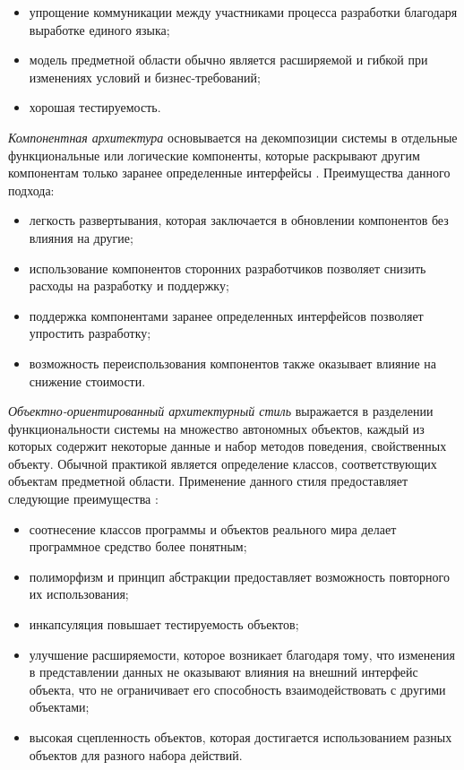 \begin{itemize}
	\item упрощение коммуникации между участниками процесса разработки благодаря выработке единого языка;
	\item модель предметной области обычно является расширяемой и гибкой при изменениях условий и бизнес-требований;
	\item хорошая тестируемость.
\end{itemize}

\emph{Компонентная архитектура} основывается на декомпозиции системы в отдельные функциональные или логические компоненты, которые раскрывают другим компонентам только заранее определенные интерфейсы \cite{application_architecture_guide}. Преимущества данного подхода:

\begin{itemize}
	\item легкость развертывания, которая заключается в обновлении компонентов без влияния на другие;
	\item использование компонентов сторонних разработчиков позволяет снизить расходы на разработку и поддержку;
	\item поддержка компонентами заранее определенных интерфейсов позволяет упростить разработку;
	\item возможность переиспользования компонентов также оказывает влияние на снижение стоимости.
\end{itemize}

\emph{Объектно-ориентированный архитектурный стиль} выражается в разделении функциональности системы на множество автономных объектов, каждый из которых содержит некоторые данные и набор методов поведения, свойственных объекту. Обычной практикой является определение классов, соответствующих объектам предметной области. Применение данного стиля предоставляет следующие преимущества \cite{application_architecture_guide}:

\begin{itemize}
	\item соотнесение классов программы и объектов реального мира делает программное средство более понятным;
	\item полиморфизм и принцип абстракции предоставляет возможность повторного их использования;
	\item инкапсуляция повышает тестируемость объектов;
	\item улучшение расширяемости, которое возникает благодаря тому, что изменения в представлении данных не оказывают влияния на внешний интерфейс объекта, что не ограничивает его способность взаимодействовать с другими объектами;
	\item высокая сцепленность объектов, которая достигается использованием разных объектов для разного набора действий.
\end{itemize}

